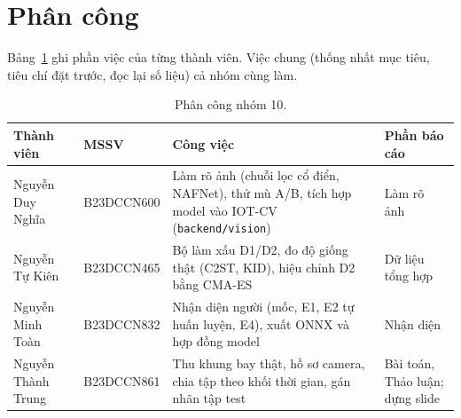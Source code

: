 \section{Phân công}\label{sec:phan-cong}

Bảng~\ref{tab:phancong} ghi phần việc của từng thành viên. Việc chung (thống nhất mục tiêu, tiêu chí đặt trước, đọc lại số liệu) cả nhóm cùng làm.

\begin{table}[!htbp]
\centering\footnotesize
\caption{Phân công nhóm 10.}
\label{tab:phancong}
\begin{tabularx}{\textwidth}{@{}>{\raggedright\arraybackslash}p{3.2cm} l X >{\raggedright\arraybackslash}p{2.9cm}@{}}
\toprule
Thành viên & MSSV & Công việc & Phần báo cáo \\
\midrule
Nguyễn Duy Nghĩa & B23DCCN600 & Làm rõ ảnh (chuỗi lọc cổ điển, NAFNet), thử mù A/B, tích hợp model vào IOT-CV (\texttt{backend/vision}) & Làm rõ ảnh \\
\addlinespace
Nguyễn Tự Kiên & B23DCCN465 & Bộ làm xấu D1/D2, đo độ giống thật (C2ST, KID), hiệu chỉnh D2 bằng CMA-ES & Dữ liệu tổng hợp \\
\addlinespace
Nguyễn Minh Toàn & B23DCCN832 & Nhận diện người (mốc, E1, E2 tự huấn luyện, E4), xuất ONNX và hợp đồng model & Nhận diện \\
\addlinespace
Nguyễn Thành Trung & B23DCCN861 & Thu khung bay thật, hồ sơ camera, chia tập theo khối thời gian, gán nhãn tập test & Bài toán, Thảo luận; dựng slide \\
\bottomrule
\end{tabularx}
\end{table}
